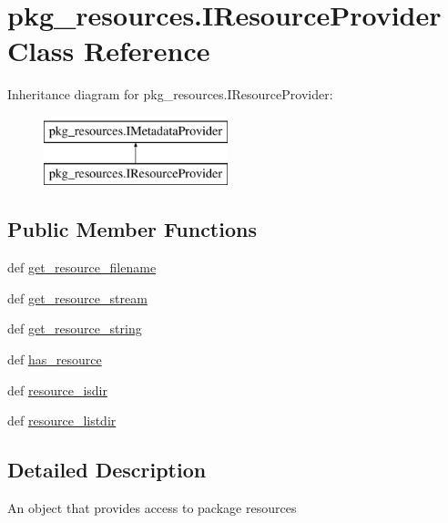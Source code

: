 \hypertarget{classpkg__resources_1_1IResourceProvider}{}\section{pkg\+\_\+resources.\+I\+Resource\+Provider Class Reference}
\label{classpkg__resources_1_1IResourceProvider}
Inheritance diagram for pkg\+\_\+resources.\+I\+Resource\+Provider\+:\begin{figure}[H]
\begin{center}
\leavevmode
\includegraphics[height=2.000000cm]{classpkg__resources_1_1IResourceProvider}
\end{center}
\end{figure}
\subsection*{Public Member Functions}
\begin{DoxyCompactItemize}
\item 
def \hyperlink{classpkg__resources_1_1IResourceProvider_aa6e11cd8830f96c80cbdc4e88008cab7}{get\+\_\+resource\+\_\+filename}
\item 
def \hyperlink{classpkg__resources_1_1IResourceProvider_a5682a11aa5cd873e75dfc6be7d5b5759}{get\+\_\+resource\+\_\+stream}
\item 
def \hyperlink{classpkg__resources_1_1IResourceProvider_ad59fdc7d6f9f31990b8e7c0bd8a4cc34}{get\+\_\+resource\+\_\+string}
\item 
def \hyperlink{classpkg__resources_1_1IResourceProvider_a64afed6d4d931927cf44ad3e66266f89}{has\+\_\+resource}
\item 
def \hyperlink{classpkg__resources_1_1IResourceProvider_a4cb330dee08f0843fb5b9b2d52a8e48c}{resource\+\_\+isdir}
\item 
def \hyperlink{classpkg__resources_1_1IResourceProvider_a26b4ccc4aa0d1251e02d4a152102382a}{resource\+\_\+listdir}
\end{DoxyCompactItemize}


\subsection{Detailed Description}
\begin{DoxyVerb}An object that provides access to package resources\end{DoxyVerb}
 


